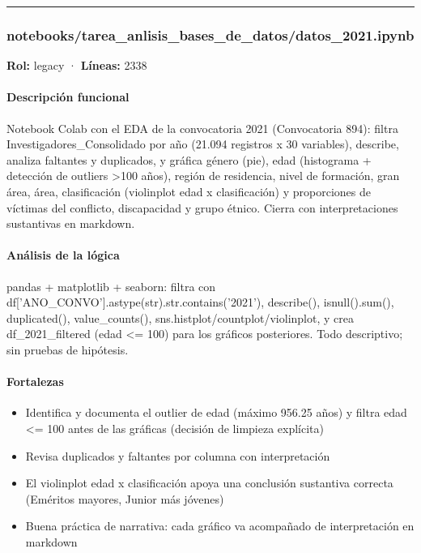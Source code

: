 \medskip
\hrule

\subsubsection{notebooks/tarea\_anlisis\_bases\_de\_datos/datos\_2021.ipynb}
\textbf{Rol:} legacy · \textbf{Líneas:} 2338

\paragraph{Descripción funcional}
Notebook Colab con el EDA de la convocatoria 2021 (Convocatoria 894): filtra Investigadores\_Consolidado por año (21.094 registros x 30 variables), describe, analiza faltantes y duplicados, y gráfica género (pie), edad (histograma + detección de outliers >100 años), región de residencia, nivel de formación, gran área, área, clasificación (violinplot edad x clasificación) y proporciones de víctimas del conflicto, discapacidad y grupo étnico. Cierra con interpretaciones sustantivas en markdown.

\paragraph{Análisis de la lógica}
pandas + matplotlib + seaborn: filtra con df['ANO\_CONVO'].astype(str).str.contains('2021'), describe(), isnull().sum(), duplicated(), value\_counts(), sns.histplot/countplot/violinplot, y crea df\_2021\_filtered (edad <= 100) para los gráficos posteriores. Todo descriptivo; sin pruebas de hipótesis.

\paragraph{Fortalezas}
\begin{itemize}
  \item Identifica y documenta el outlier de edad (máximo 956.25 años) y filtra edad <= 100 antes de las gráficas (decisión de limpieza explícita)
  \item Revisa duplicados y faltantes por columna con interpretación
  \item El violinplot edad x clasificación apoya una conclusión sustantiva correcta (Eméritos mayores, Junior más jóvenes)
  \item Buena práctica de narrativa: cada gráfico va acompañado de interpretación en markdown
\end{itemize}


